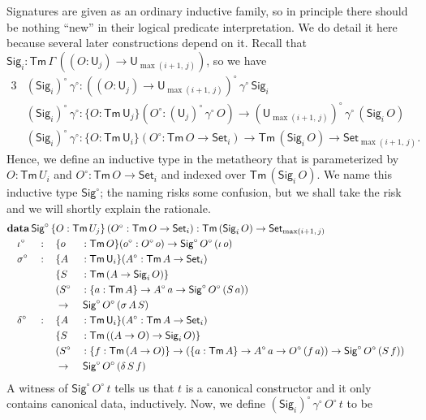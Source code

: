 \documentclass[acmsmall,screen,review,anonymous]{acmart}
\newcommand{\msf}[1]{{\mathsf{#1}}}
\newcommand{\mbf}[1]{{\mathbf{#1}}}
\newcommand{\data}{\mbf{data}}
\newcommand{\U}{\msf{U}}
\newcommand{\Set}{\msf{Set}}
\newcommand{\Sig}{\msf{Sig}}
\newcommand{\Tm}{\msf{Tm}}
\newcommand{\w}{\circ}
\begin{document}
Signatures are given as an ordinary inductive family, so in principle there should be nothing
``new'' in their logical predicate interpretation. We do detail it here because several later
constructions depend on it. Recall that $\Sig_i : \Tm\,\Gamma\,((O : \U_j) \to \U_{\max(i+1,\,j)})$,
so we have
\begin{alignat*}{3}
  &(\Sig_i)^\w\,\gamma^\w : ((O : \U_j) \to \U_{\max(i+1,\,j)})^\w\,\gamma^\w\,\Sig_i\\
  &(\Sig_i)^\w\,\gamma^\w : \{O : \Tm\,\U_j\}(O^\w : (\U_j)^\w\,\gamma^\w\,O) \to (\U_{\max(i+1,\,j)})^\w\,\gamma^\w\,(\Sig_i\,O)\\
  &(\Sig_i)^\w\,\gamma^\w : \{O : \Tm\,\U_i\}(O^\w : \Tm\,O \to \Set_i) \to \Tm\,(\Sig_i\,O) \to \Set_{\max(i+1,\,j)}.
\end{alignat*}
Hence, we define an inductive type in the metatheory that is parameterized by $O : \Tm\,U_i$ and
$O^\w : \Tm\,O \to \Set_i$ and indexed over $\Tm\,(\Sig_i\,O)$. We name this inductive type
$\Sig^\w$; the naming risks some confusion, but we shall take the risk and we will shortly
explain the rationale.
\begin{alignat*}{4}
  &\rlap{$\data\,\Sig^\w\,\{O : \Tm\,U_j\}\,(O^\w : \Tm\,O \to \Set_i)  : \Tm\,(\Sig_i\,O) \to \Set_{\max(i+1,\,j)}$}\\
  &\quad \iota^\w  &&:\,&&\{o &&: \Tm\,O\}(o^\w : O^\w\,o) \to \Sig^\w\,O^\w\,(\iota\,o)\\
  &\quad \sigma^\w &&:\,&&\{A &&: \Tm\,\U_i\}(A^\w : \Tm\,A \to \Set_i)\\
  &               && &&\{S &&: \Tm\,(A \to \Sig_i\,O)\}\\
  &               && && (S^\w &&: \{a : \Tm\,A\} \to A^\w\,a \to \Sig^\w\,O^\w\,(S\,a))\\
  &               && && \to &&\,\Sig^\w\,O^\w\,(\sigma\,A\,S)\\
  &\quad \delta^\w &&:\,&&\{A &&: \Tm\,\U_i\}(A^\w : \Tm\,A \to \Set_i)\\
  &               &&   && \{S &&: \Tm\,((A \to O) \to \Sig_i\,O)\}\\
  &               &&   && (S^\w &&: \{f : \Tm\,(A \to O)\} \to (\{a : \Tm\,A\} \to A^\w\,a \to O^\w\,(f\,a)) \to \Sig^\w\,O^\w\,(S\,f))\\
  &\quad          &&   && \to &&\,\Sig^\w\,O^\w\,(\delta\,S\,f)
\end{alignat*}
A witness of $\Sig^\w\,O^\w\,t$ tells us that $t$ is a canonical constructor and it only contains
canonical data, inductively. Now, we define $(\Sig_i)^\w\,\gamma^\w\,O^\w\,t$ to be
\end{document}
